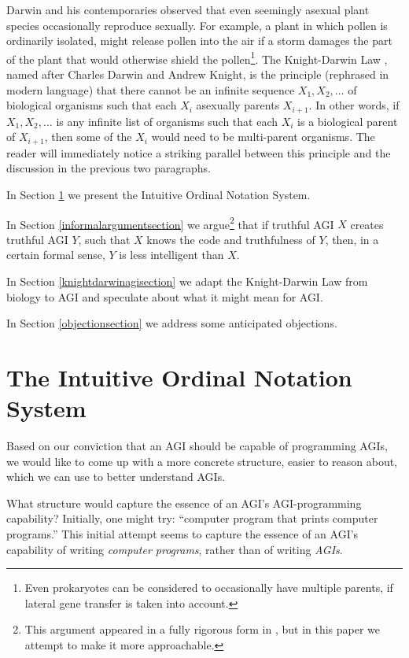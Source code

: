 \documentclass[runningheads]{llncs}
\begin{document}
Darwin and his contemporaries observed that even
seemingly asexual plant species occasionally reproduce sexually.
For example, a plant in which pollen is ordinarily isolated, might
release pollen into the air if a storm damages the part of the
plant that would otherwise shield the pollen\footnote{Even prokaryotes can
be considered to occasionally have multiple parents, if lateral gene
transfer is taken into account.}.
The Knight-Darwin Law \cite{darwin1898knight}, named after Charles Darwin
and Andrew Knight, is the
principle (rephrased in modern language) that there cannot be an infinite
sequence $X_1,X_2,\ldots$ of biological organisms such that each $X_i$ asexually
parents $X_{i+1}$. In other words, if $X_1,X_2,\ldots$ is any infinite list of
organisms such that each $X_i$ is a biological parent of $X_{i+1}$, then some of the
$X_i$ would need to be multi-parent organisms.
The reader will immediately notice a striking parallel between
this principle and the discussion in the previous two paragraphs.

In Section \ref{notationsystemsection} we present the Intuitive Ordinal Notation
System.

In Section \ref{informalargumentsection} we argue\footnote{This argument appeared
in a fully rigorous form in \cite{alexander2019measuring},
but in this paper we attempt to make it more approachable.} that if truthful AGI $X$ creates
truthful AGI $Y$, such that $X$
knows the code and truthfulness of $Y$, then, in a certain formal sense, $Y$ is
less intelligent
than $X$.

In Section \ref{knightdarwinagisection} we adapt the Knight-Darwin Law from biology to AGI
and speculate about what it might mean for AGI.

In Section \ref{objectionsection} we address some anticipated objections.



\section{The Intuitive Ordinal Notation System}
\label{notationsystemsection}

Based on our conviction that an AGI should be capable of programming AGIs,
we would like to come up with a more concrete structure, easier to reason
about, which we can use to better understand AGIs.

What structure would capture the essence of an AGI's AGI-programming
capability? Initially, one might try: ``computer
program that prints computer programs.'' This initial attempt seems to
capture the essence of an
AGI's capability of writing \emph{computer programs}, rather than of writing \emph{AGIs}.
\end{document}
